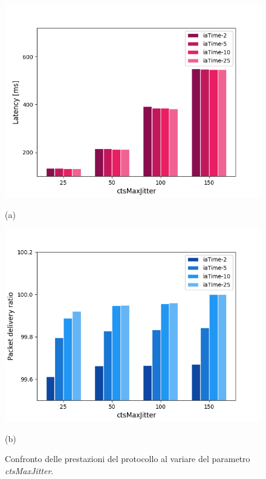 \documentclass[binding=0.6cm,TFA]{sapthesis}
\begin{document}
\begin{figure}[h]
    \centering
    \begin{minipage}{.5\textwidth}
        \centering
        \includegraphics[width=1\linewidth]{latency_jitter_comparison_plot.png}
        \caption*{(a)}
    \end{minipage}%
    \begin{minipage}{.5\textwidth}
        \centering
        \includegraphics[width=1\linewidth]{pdr_jitter_comparison_plot.png}
        \caption*{(b)}
    \end{minipage}
    \caption{Confronto delle prestazioni del protocollo al variare del parametro \emph{ctsMaxJitter}.}
    \label{comparison-cts-latency}
\end{figure}
\end{document}
